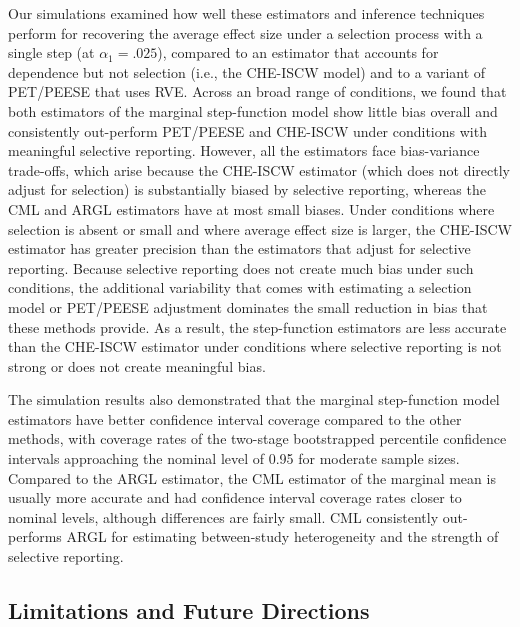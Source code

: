 \documentclass[
  american,
  man, donotrepeattitle,floatsintext]{apa7}
\begin{document}
Our simulations examined how well these estimators and inference techniques perform for recovering the average effect size under a selection process with a single step (at \(\alpha_1 = .025\)), compared to an estimator that accounts for dependence but not selection (i.e., the CHE-ISCW model) and to a variant of PET/PEESE that uses RVE.
Across an broad range of conditions, we found that both estimators of the marginal step-function model show little bias overall and consistently out-perform PET/PEESE and CHE-ISCW under conditions with meaningful selective reporting.
However, all the estimators face bias-variance trade-offs, which arise because the CHE-ISCW estimator (which does not directly adjust for selection) is substantially biased by selective reporting, whereas the CML and ARGL estimators have at most small biases.
Under conditions where selection is absent or small and where average effect size is larger, the CHE-ISCW estimator has greater precision than the estimators that adjust for selective reporting.
Because selective reporting does not create much bias under such conditions, the additional variability that comes with estimating a selection model or PET/PEESE adjustment dominates the small reduction in bias that these methods provide.
As a result, the step-function estimators are less accurate than the CHE-ISCW estimator under conditions where selective reporting is not strong or does not create meaningful bias.

The simulation results also demonstrated that the marginal step-function model estimators have better confidence interval coverage compared to the other methods, with coverage rates of the two-stage bootstrapped percentile confidence intervals approaching the nominal level of 0.95 for moderate sample sizes.
Compared to the ARGL estimator, the CML estimator of the marginal mean is usually more accurate and had confidence interval coverage rates closer to nominal levels, although differences are fairly small.
CML consistently out-performs ARGL for estimating between-study heterogeneity and the strength of selective reporting.

\subsection{Limitations and Future Directions}\label{limitations-and-future-directions}
\end{document}
